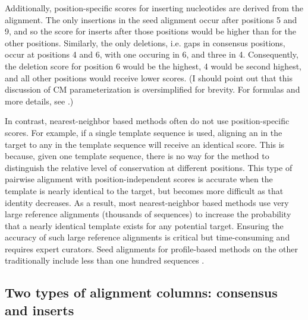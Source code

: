 Additionally, position-specific scores for inserting nucleotides are
derived from the alignment. The only insertions in the seed alignment
occur after positions 5 and 9, and so the score for inserts after
those positions would be higher than for the other
positions. Similarly, the only deletions, i.e. gaps in consensus
positions, occur at positions 4 and 6, with one occuring in 6, and
three in 4. Consequently, the deletion score for position 6 would be
the highest, 4 would be second highest, and all other
positions would receive lower scores. 
(I should point out that this discussion of CM parameterization is
oversimplified for brevity. For formulas and more details, see
\cite{Eddy94,Durbin98,Nawrocki09}.)

In contrast, nearest-neighbor based methods often do not use
position-specific scores. For example, if a single template sequence
is used,  aligning an  in the target to any  in the
template sequence will receive an identical score. This is because, given
one template sequence, there is no way for the method to distinguish
the relative level of conservation at different positions.
This type of pairwise alignment with position-independent scores is
accurate when the template is nearly identical to the target, but
becomes more difficult as that identity decreases. As a result, most
nearest-neighbor based methods use very large reference alignments
(thousands of sequences) to increase the probability that a nearly
identical template exists for any potential target. Ensuring the
accuracy of such large reference alignments is critical 
but time-consuming and requires expert curators. 
Seed alignments for profile-based methods on the other
traditionally include less than one hundred sequences
\cite{Finn10,Gardner09}.

\subsection{Two types of alignment columns: consensus and inserts}

